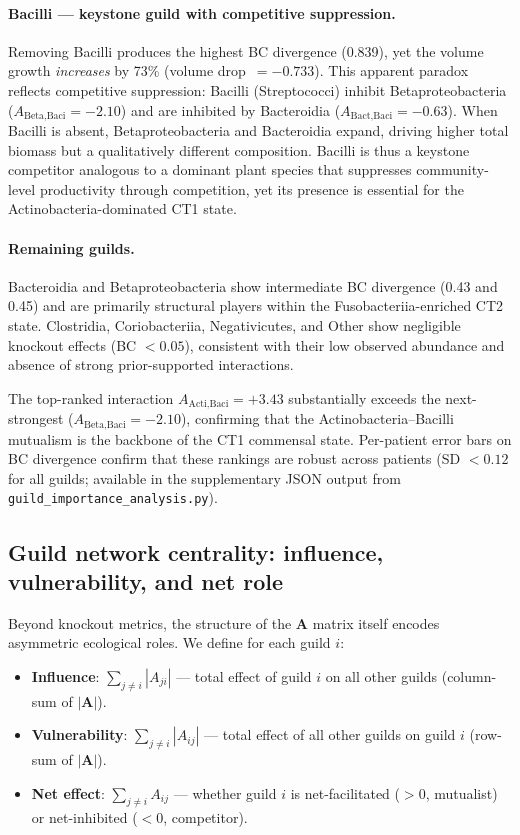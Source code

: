 \documentclass[11pt,a4paper]{article}
\newcommand{\bA}{\mathbf{A}}
\begin{document}
\paragraph{Bacilli — keystone guild with competitive suppression.}
Removing Bacilli produces the highest BC divergence (0.839), yet the volume
growth \emph{increases} by 73\% (volume drop~$=-0.733$). This apparent paradox
reflects competitive suppression: Bacilli (Streptococci) inhibit Betaproteobacteria
($A_{\text{Beta,Baci}}=-2.10$) and are inhibited by Bacteroidia
($A_{\text{Bact,Baci}}=-0.63$). When Bacilli is absent, Betaproteobacteria and
Bacteroidia expand, driving higher total biomass but a qualitatively different
composition. Bacilli is thus a keystone competitor analogous to a dominant
plant species that suppresses community-level productivity through competition,
yet its presence is essential for the Actinobacteria-dominated CT1 state.

\paragraph{Remaining guilds.}
Bacteroidia and Betaproteobacteria show intermediate BC divergence (0.43 and 0.45)
and are primarily structural players within the Fusobacteriia-enriched CT2 state.
Clostridia, Coriobacteriia, Negativicutes, and Other show negligible knockout
effects (BC $<0.05$), consistent with their low observed abundance and
absence of strong prior-supported interactions.

The top-ranked interaction $A_{\text{Acti,Baci}}=+3.43$ substantially exceeds the
next-strongest ($A_{\text{Beta,Baci}}=-2.10$), confirming that the Actinobacteria--Bacilli
mutualism is the backbone of the CT1 commensal state.
Per-patient error bars on BC divergence confirm that these rankings are robust
across patients (SD $< 0.12$ for all guilds; available in the supplementary
JSON output from \texttt{guild\_importance\_analysis.py}).

\subsection{Guild network centrality: influence, vulnerability, and net role}
\label{ssec:network}

Beyond knockout metrics, the structure of the $\bA$ matrix itself encodes
asymmetric ecological roles.  We define for each guild $i$:
\begin{itemize}[noitemsep]
  \item \textbf{Influence}: $\sum_{j\neq i}|A_{ji}|$ --- total effect of guild $i$
        on all other guilds (column-sum of $|\bA|$).
  \item \textbf{Vulnerability}: $\sum_{j\neq i}|A_{ij}|$ --- total effect of all
        other guilds on guild $i$ (row-sum of $|\bA|$).
  \item \textbf{Net effect}: $\sum_{j\neq i} A_{ij}$ --- whether guild $i$ is
        net-facilitated ($>0$, mutualist) or net-inhibited ($<0$, competitor).
\end{itemize}
\end{document}
